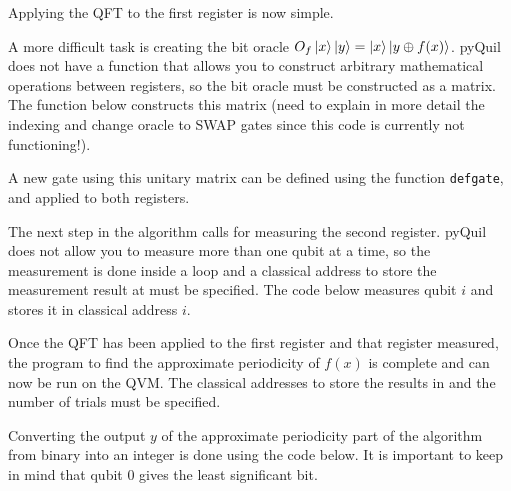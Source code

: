 

Applying the QFT to the first register is now simple.



A more difficult task is creating the bit oracle $O_f\left\vert{x}\right\rangle\left\vert{y}\right\rangle = \left\vert{x}\right\rangle\left\vert{y \oplus f(x)}\right\rangle$. pyQuil does not have a function that allows you to construct arbitrary mathematical operations between registers, so the bit oracle must be constructed as a matrix. The function below constructs this matrix (need to explain in more detail the indexing and change oracle to SWAP gates since this code is currently not functioning!).



A new gate using this unitary matrix can be defined using the function \texttt{defgate}, and applied to both registers.



The next step in the algorithm calls for measuring the second register. pyQuil does not allow you to measure more than one qubit at a time, so the measurement is done inside a loop and a classical address to store the measurement result at must be specified. The code below measures qubit $i$ and stores it in classical address $i$.



Once the QFT has been applied to the first register and that register measured, the program to find the approximate periodicity of $f(x)$ is complete and can now be run on the QVM. The classical addresses to store the results in and the number of trials must be specified.



Converting the output $y$ of the approximate periodicity part of the algorithm from binary into an integer is done using the code below. It is important to keep in mind that qubit 0 gives the least significant bit.



